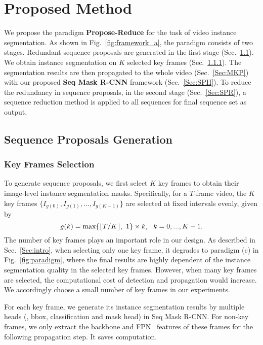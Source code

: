 \documentclass[10pt,twocolumn,letterpaper]{article}
\begin{document}
	
	\section{Proposed Method}
	
	We propose the paradigm \textbf{Propose-Reduce} for the task of video instance segmentation. As shown in Fig.~\ref{fig:framework_a}, the paradigm consists of two stages. Redundant sequence proposals are generated in the first stage (Sec.~\ref{Sec:SPG}). We obtain instance segmentation on $K$ selected key frames (Sec.~\ref{Sec:KFS}). The segmentation results are then propagated to the whole video (Sec.~\ref{Sec:MKP}) with our proposed \textbf{Seq Mask R-CNN} framework (Sec.~\ref{Sec:SPH}).
	To reduce the redundancy in sequence proposals, in the second stage (Sec.~\ref{Sec:SPR}), a sequence reduction method is applied to all sequences for final sequence set as output. 
	
	
	\subsection{Sequence Proposals Generation}\label{Sec:SPG}
	\subsubsection{Key Frames Selection}\label{Sec:KFS}
	To generate sequence proposals, we first select $K$ key frames to obtain their image-level instance segmentation masks. Specifically, for a $T$-frame video, the $K$ key frames $\{I_{g(0)},I_{g(1)},...,I_{g(K-1)}\}$ are selected at fixed intervals evenly, given by
	\begin{equation}
	\label{eq:keyframe}
	g(k) = \max\{\lfloor T/K \rfloor,~1\}\times k,~~k=0,..., K-1.
	\vspace{-0.1in}
	\end{equation}
	The number of key frames plays an important role in our design. 
	As described in Sec.~\ref{Sec:intro}, when selecting only one key frame, it degrades to paradigm (c) in Fig.~\ref{fig:paradigm}, where the final results are highly dependent of the instance segmentation quality in the selected key frames.
	However, when many key frames are selected, the computational cost of detection and propagation would increase.
	We accordingly choose a small number of key frames in our experiments. 
	
	For each key frame, we generate its instance segmentation results by multiple heads (\ie, bbox, classification and mask head) in Seq Mask R-CNN. For non-key frames, we only extract the backbone and FPN~\cite{lin2017feature} features of these frames for the following propagation step.
	It saves computation. 
	
\end{document}
